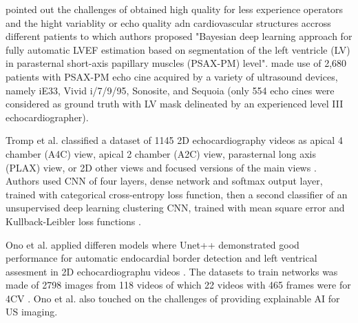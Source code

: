 \cite{jafari2021} pointed out the challenges of obtained high quality for less experience operators and the hight variablity or echo quality adn cardiovascular structures accross different patients to which authors proposed "Bayesian deep learning approach for fully automatic LVEF estimation based on segmentation of the left ventricle (LV) in parasternal short-axis papillary muscles (PSAX-PM) level". 
\cite{jafari2021} made use of 2,680 patients with PSAX-PM echo cine acquired by a variety of ultrasound devices, namely iE33, Vivid i/7/9/95, Sonosite, and Sequoia (only 554 echo cines were considered as ground truth with LV mask delineated by an experienced level III
echocardiographer).

Tromp et al. classified a dataset of 1145 2D echocardiography videos as apical 4 chamber (A4C) view, apical 2 chamber (A2C) view, parasternal long axis (PLAX) view, or 2D other views and focused versions of the main views \cite{tromp2022}.
Authors used CNN of four layers, dense network and softmax output layer, trained with categorical cross-entropy loss function, then a second classifier of an unsupervised deep learning clustering CNN, trained with mean square error and Kullback-Leibler loss functions \cite{tromp2022}.


Ono et al. applied differen models where Unet++ demonstrated good performance for automatic endocardial border detection and left ventrical assesment in 2D echocardiographu videos \cite{ono2022}.
The datasets to train networks was made of 2798 images from 118 videos of which 22 videos with 465 frames were for 4CV \cite{ono2022}.
Ono et al. also touched on the challenges of providing explainable AI for US imaging.






